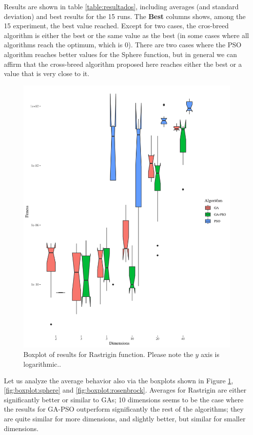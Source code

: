 \documentclass[runningheads]{llncs}
\begin{document}
Results are shown in table \ref{table:resultados}, including averages
(and standard deviation) and best results for the 15 runs. The {\bf
  Best} columns shows, among the 15 experiment, the best value
reached. Except for two cases, the cros-breed algorithm is either the
best or the same value as the best (in some cases where all algorithms
reach the optimum, which is 0). There are two cases where the PSO
algorithm reaches better values for the Sphere function, but in
general we can affirm that the cross-breed algorithm proposed here
reaches either the best or a value that is very close to it.
%
\begin{figure}[h!tb]
  \centering
  \includegraphics[height=0.4\textheight]{img/rastrigin-boxplot.png}
  \caption{Boxplot of results for Rastrigin function. Please note the $y$ axis is logarithmic..\label{fig:boxplot:rastrigin}}
\end{figure}

Let us analyze the average behavior also via the boxplots shown
in Figure \ref{fig:boxplot:rastrigin},  \ref{fig:boxplot:sphere} and
\ref{fig:boxplot:rosenbrock}. Averages for Rastrigin are either
significantly better or similar to GAs; 10 dimensions seems to be the
case where the results for GA-PSO outperform significantly the rest of
the algorithms; they are quite similar for more dimensions, and
slightly better, but similar for smaller dimensions. 
\end{document}
